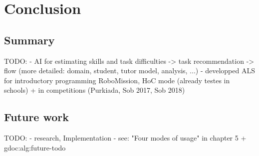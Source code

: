 \chapter{Conclusion}
\label{chap:conclusion}

\section{Summary}
\label{sec:conclusion.summary}

TODO:
- AI for estimating skills and task difficulties -> task recommendation -> flow
  (more detailed: domain, student, tutor model, analysis, ...)
- developped ALS for introductory programming RoboMission, HoC mode
  (already testes in schools) + in competitions (Purkiada, Sob 2017, Sob 2018)

\section{Future work}
\label{sec:conclusion.future-work}

TODO:
- research, Implementation
- see: "Four modes of usage" in chapter 5 + gdoc:alg:future-todo
